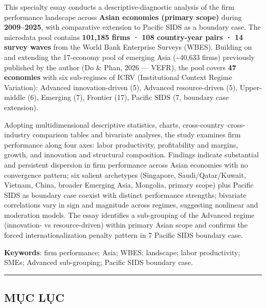 \documentclass[12pt,a4paper]{article}
\begin{document}
This specialty essay conducts a descriptive-diagnostic analysis of the
firm performance landscape across \textbf{Asian economies (primary
scope)} during \textbf{2009--2025}, with comparative extension to
Pacific SIDS as a boundary case. The microdata pool contains
\textbf{101,185 firms · 108 country-year pairs · 14 survey waves} from
the World Bank Enterprise Surveys (WBES). Building on and extending the
17-economy pool of emerging Asia (\textasciitilde40,633 firms)
previously published by the author (Do \& Phan, 2026 --- VEFR), the pool
covers \textbf{47 economies} with six sub-regimes of ICRV (Institutional
Context Regime Variation): Advanced innovation-driven (5), Advanced
resource-driven (5), Upper-middle (6), Emerging (7), Frontier (17),
Pacific SIDS (7, boundary case extension).

Adopting multidimensional descriptive statistics, charts,
cross-country--cross-industry comparison tables and bivariate analyses,
the study examines firm performance along four axes: labor productivity,
profitability and margins, growth, and innovation and structural
composition. Findings indicate substantial and persistent dispersion in
firm performance across Asian economies with no convergence pattern; six
salient archetypes (Singapore, Saudi/Qatar/Kuwait, Vietnam, China,
broader Emerging Asia, Mongolia, primary scope) plus Pacific SIDS as
boundary case coexist with distinct performance strengths; bivariate
correlations vary in sign and magnitude across regimes, suggesting
nonlinear and moderation models. The essay identifies a sub-grouping of
the Advanced regime (innovation- vs resource-driven) within primary
Asian scope and confirms the forced internationalization penalty pattern
in 7 Pacific SIDS boundary case.

\textbf{Keywords}: firm performance; Asia; WBES; landscape; labor
productivity; SMEs; Advanced sub-grouping; Pacific SIDS boundary case.

\begin{center}\rule{0.5\linewidth}{0.5pt}\end{center}

\hypertarget{mux1ee5c-lux1ee5c}{%
\subsection{MỤC LỤC}\label{mux1ee5c-lux1ee5c}}
\end{document}
